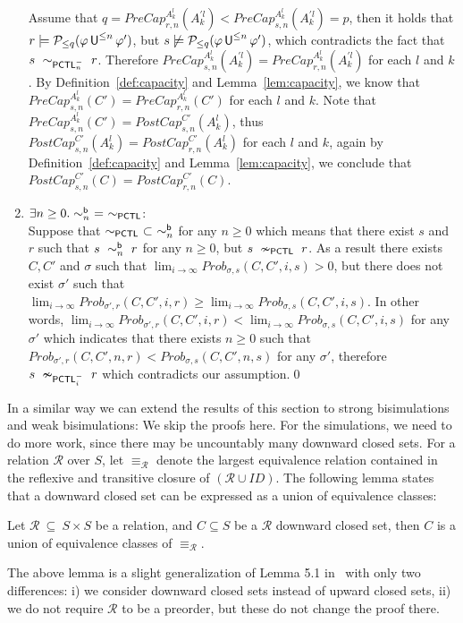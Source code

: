 \documentclass{LMCS}
\def\phi{\varphi}
\DeclareMathOperator{\U}{\text{\sf U}}
\newcommand{\PCTL}{{\sf PCTL}}
\newcommand{\iBSB}[1]{\sim_{#1}^{{\sf b}}}
\newcommand{\EPCTL}{\sim_{\PCTL}}
\newcommand{\iEPCTLM}[1]{\sim_{\PCTL^{-}_{#1}}}
\newcommand{\inEPCTLM}[1]{\nsim_{\PCTL^{-}_{#1}}}
\newcommand{\nEPCTL}{\nsim_{\PCTL}}
\newcommand{\MC}[1]{\mathcal{#1}}
\newcommand{\MI}[1]{\mathit{#1}}
\newcommand{\MEASURE}{\mathit{Prob}}
\newcommand{\MEASUREONE}{\mathit{PreCap}}
\newcommand{\MEASURETWO}{\mathit{PostCap}}
\begin{document}
\begin{enumerate}[(1)]
  Assume that
  $q=\MEASUREONE_{r,n}^{A_k^l}(A_k^{'l})<\MEASUREONE_{s,n}^{A_k^l}(A_k^{'l})=p$,
  then it holds that $r\models\MC{P}_{\leq q}(\phi\U^{\leq n}\phi')$,
  but $s\not\models\MC{P}_{\leq q}(\phi\U^{\leq n}\phi')$, which
  contradicts the fact that $s~\iEPCTLM{n}~r$. Therefore
  $\MEASUREONE_{s,n}^{A_k^l}(A_k^{'l})=\MEASUREONE_{r,n}^{A_k^l}(A_k^{'l})$
  for each $l$ and $k$.  By Definition~\ref{def:capacity} and
  Lemma~\ref{lem:capacity}, we know that
  $\MEASUREONE_{s,n}^{A_k^l}(C')=\MEASUREONE_{r,n}^{A_k^l}(C')$ for
  each $l$ and $k$. Note that
  $\MEASUREONE_{s,n}^{A_k^l}(C')=\MEASURETWO_{s,n}^{C'}(A_k^l)$, thus
  $\MEASURETWO_{s,n}^{C'}(A_k^l)=\MEASURETWO_{r,n}^{C'}(A_k^l)$ for
  each $l$ and $k$, again by Definition~\ref{def:capacity} and
  Lemma~\ref{lem:capacity}, we conclude that
  $\MEASURETWO_{s,n}^{C'}(C)=\MEASURETWO_{r,n}^{C'}(C)$.
  \item  $\exists n\geq 0.\iBSB{n}~=~\EPCTL$:\\
  Suppose that $\EPCTL~\subset~\iBSB{n}$ for any $n\geq 0$ which
  means that there exist $s$ and $r$ such that $s~\iBSB{n}~r$ for any
  $n\geq 0$, but $s~\nEPCTL~r$. As a result there exists $C,C'$ and
  $\sigma$ such that
  $\lim_{i\rightarrow\infty}\MEASURE_{\sigma,s}(C,C',i,s)>0$, but
  there does not exist $\sigma'$ such that
  $\lim_{i\rightarrow\infty}\MEASURE_{\sigma',r}(C,C',i,r)\geq\lim_{i\rightarrow\infty}\MEASURE_{\sigma,s}(C,C',i,s)$. In
  other words,
  $\lim_{i\rightarrow\infty}\MEASURE_{\sigma',r}(C,C',i,r)<\lim_{i\rightarrow\infty}\MEASURE_{\sigma,s}(C,C',i,s)$
  for any $\sigma'$ which indicates that there exists $n\geq 0$ such
  that $\MEASURE_{\sigma',r}(C,C',n,r)<\MEASURE_{\sigma,s}(C,C',n,s)$
  for any $\sigma'$, therefore $s~\inEPCTLM{i}~r$ which contradicts
  our assumption.\qed
\end{enumerate}


\noindent In a similar way we can extend the results of this section to strong
bisimulations and weak bisimulations: We skip the proofs here. For
the simulations, we need to do more work, since there may be
uncountably many downward closed sets.  For a relation $\MC{R}$ over
$S$, let $\equiv_{\MC{R}}$ denote the largest equivalence relation
contained in the reflexive and transitive closure of
$(\MC{R}\cup\MI{ID})$. The following lemma states that a downward
closed set can be expressed as a union of equivalence classes:

\begin{lem}\label{lem:downward equivalence}
Let $\MC{R}~\subseteq~S\times S$ be a relation, and $C\subseteq S$ be a $\MC{R}$ downward closed set, then $C$ is a union of equivalence classes of $\equiv_{\MC{R}}$.
\end{lem}
The above lemma is a slight generalization of Lemma 5.1
in~\cite{HermannsPSWZ11} with only two differences: i) we consider
downward closed sets instead of upward closed sets, ii) we do not
require $\MC{R}$ to be a preorder, but these do not change the proof
there.
\end{document}
